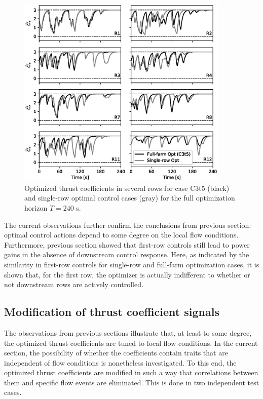 	\begin{figure}
		\centering
		\includegraphics[width=0.9\textwidth]{chapters/analysis_induction_control/fullfarm_singlerow.eps}
		\caption{Optimized thrust coefficients in several rows for case C3t5 (black) and single-row optimal control cases (gray) for the full optimization horizon $T = 240$ s.\label{fig:control_C3t5_singlerow}}
	\end{figure}
	

	
	The current observations further confirm the conclusions from previous section: optimal control actions depend to some degree on the local flow conditions. Furthermore, previous section showed that first-row controls still lead to power gains in the absence of downstream control response. Here, as indicated by the similarity in first-row controls for single-row and full-farm optimization cases, it is shown that, for the first row, the optimizer is actually indifferent to whether or not downstream rows are actively controlled. 
	
	
	\subsection{Modification of thrust coefficient signals}\label{sec:modified_thrust}
	The observations from previous sections illustrate that, at least to some degree, the optimized thrust coefficients are tuned to local flow conditions. In the current section, the possibility of whether the coefficients contain traits that are independent of flow conditions is nonetheless investigated. To this end, the optimized thrust coefficients are modified in such a way that correlations between them and specific flow events are eliminated. This is done in two independent test cases.
	
